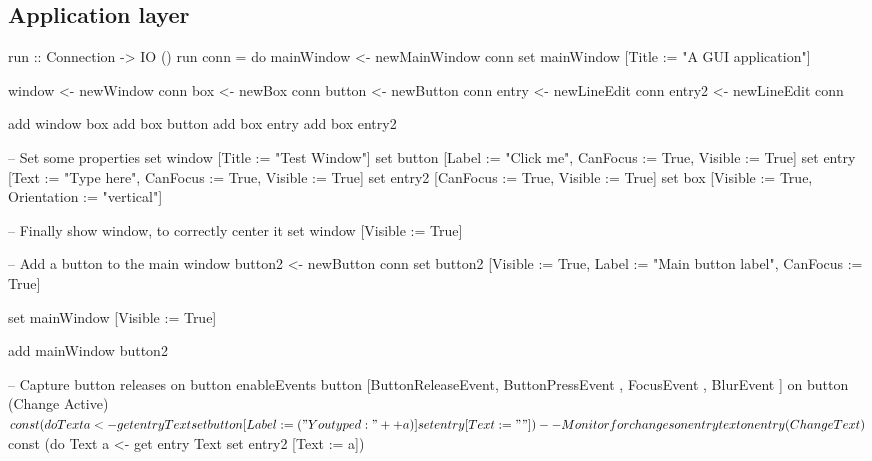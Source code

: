 \documentclass[11pt,a4paper]{article}
\begin{document}
\subsection{Application layer}
\begin{haskell}
run :: Connection -> IO ()
run conn = do mainWindow <- newMainWindow conn
              set mainWindow [Title := "A GUI application"]

              window <- newWindow conn
              box <- newBox conn
              button <- newButton conn
              entry <- newLineEdit conn
              entry2 <- newLineEdit conn
              
              add window box
              add box button
              add box entry
              add box entry2
              
              -- Set some properties
              set window [Title := "Test Window"]
              set button [Label := "Click me",
                          CanFocus := True,
                          Visible := True]
              set entry [Text := "Type here",
                         CanFocus := True,
                         Visible := True]
              set entry2 [CanFocus := True,
                          Visible := True]
              set box [Visible := True,
                       Orientation := "vertical"]
               
              -- Finally show window, to correctly center it
              set window [Visible := True]
              
              -- Add a button to the main window
              button2 <- newButton conn
              set button2 [Visible := True,
                           Label := "Main button label",
                           CanFocus := True]

              set mainWindow [Visible := True]
              
              add mainWindow button2
              
              -- Capture button releases on button
              enableEvents button [ButtonReleaseEvent,
                                   ButtonPressEvent  ,
                                   FocusEvent        ,
                                   BlurEvent         ]
              on button (Change Active)
                $ const (do Text a <- get entry Text
                            set button [Label := ("You typed: " ++ a)]
                            set entry [Text := ""])
              -- Monitor for changes on entry text
              on entry (Change Text)
                $ const (do Text a <- get entry Text
                            set entry2 [Text := a])

\end{haskell}


{}

\end{document}
